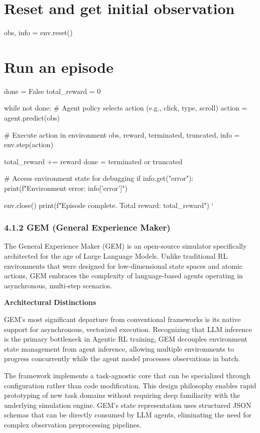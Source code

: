 \section{Reset and get initial observation}
obs, info = env.reset()

\section{Run an episode}
done = False
total_reward = 0

while not done:
    # Agent policy selects action (e.g., click, type, scroll)
    action = agent.predict(obs)
    
    # Execute action in environment
    obs, reward, terminated, truncated, info = env.step(action)
    
    total_reward += reward
    done = terminated or truncated
    
    # Access environment state for debugging
    if info.get("error"):
        print(f"Environment error: {info['error']}")

env.close()
print(f"Episode complete. Total reward: {total_reward}")
\texttt{}`

\subsubsection{4.1.2 GEM (General Experience Maker)}

The General Experience Maker (GEM) is an open-source simulator specifically architected for the age of Large Language Models. Unlike traditional RL environments that were designed for low-dimensional state spaces and atomic actions, GEM embraces the complexity of language-based agents operating in asynchronous, multi-step scenarios.

\textbf{Architectural Distinctions}

GEM's most significant departure from conventional frameworks is its native support for asynchronous, vectorized execution. Recognizing that LLM inference is the primary bottleneck in Agentic RL training, GEM decouples environment state management from agent inference, allowing multiple environments to progress concurrently while the agent model processes observations in batch.

The framework implements a task-agnostic core that can be specialized through configuration rather than code modification. This design philosophy enables rapid prototyping of new task domains without requiring deep familiarity with the underlying simulation engine. GEM's state representation uses structured JSON schemas that can be directly consumed by LLM agents, eliminating the need for complex observation preprocessing pipelines.

